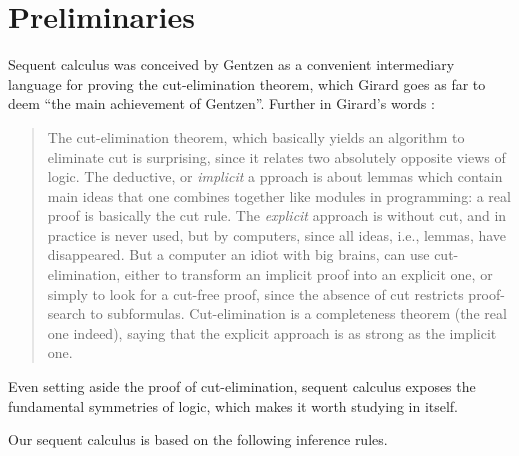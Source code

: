 


\maketitle

\section{Preliminaries}

Sequent calculus was conceived by Gentzen as a convenient intermediary language
for proving the cut-elimination theorem, which Girard \cite[pg.
106]{locus-solum} goes as far to deem ``the main achievement of Gentzen''.
Further in Girard's words \cite[pg. 106]{locus-solum}:
\begin{quote}
  The cut-elimination theorem, which basically yields an algorithm to eliminate
  cut is surprising, since it relates two absolutely opposite views of logic.
  The deductive, or \emph{implicit} a pproach is about lemmas which contain
  main ideas that one combines together like modules in programming:
  a real proof is basically the cut rule. The \emph{explicit} approach is
  without cut, and in practice is never used, but by computers, since all
  ideas, i.e., lemmas, have disappeared. But a computer an idiot with big
  brains, can use cut-elimination, either to transform an implicit proof into
  an explicit one, or simply to look for a cut-free proof, since the absence
  of cut restricts proof-search to subformulas. Cut-elimination is a
  completeness theorem (the real one indeed), saying that the explicit
  approach is as strong as the implicit one.
\end{quote}

Even setting aside the proof of cut-elimination, sequent calculus exposes the
fundamental symmetries of logic, which makes it worth studying in itself.

Our sequent calculus is based on the following inference rules.

